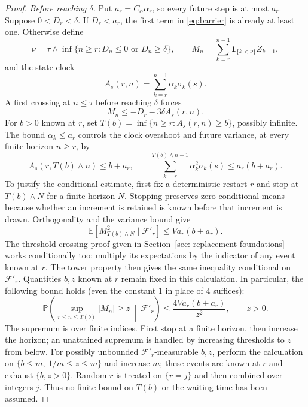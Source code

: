 \begin{proof}
\emph{Before reaching $\delta$.} Put $a_r=C_\alpha\alpha_r$, so every future step is at most $a_r$. Suppose $0<D_r<\delta$. If $D_r<a_r$, the first term in \eqref{eq:barrier} is already
at least one. Otherwise define
\[
\nu=\tau\wedge\inf\{n\ge r:D_n\le0\text{ or }D_n\ge\delta\},\qquad
M_n=\sum_{k=r}^{n-1}\mathbf1_{\{k<\nu\}}Z_{k+1},
\]
and the state clock
\begin{equation}\label{eq:clock}
A_s(r,n)=\sum_{k=r}^{n-1}\alpha_k\sigma_k(s).
\end{equation}
A first crossing at $n\le\tau$ before reaching $\delta$ forces
\begin{equation}\label{eq:crossing}
M_n\le-D_r-3\delta A_s(r,n).
\end{equation}
For $b>0$ known at $r$, set $T(b)=\inf\{n\ge r:A_s(r,n)\ge b\}$, possibly infinite. The bound $\alpha_k\le a_r$ controls the clock overshoot and future variance, at every finite horizon $n\ge r$, by
\[
A_s(r,T(b)\wedge n)\le b+a_r,\qquad
\sum_{k=r}^{T(b)\wedge n-1}\alpha_k^2\sigma_k(s)\le a_r(b+a_r).
\]
To justify the conditional estimate, first fix a deterministic restart $r$ and stop at $T(b)\wedge N$ for a finite horizon $N$. Stopping preserves zero conditional means because whether an increment is retained is known before that increment is drawn. Orthogonality and the variance bound give
\[
\mathbb E[M_{T(b)\wedge N}^2\mid\mathcal F'_r]
\le V a_r(b+a_r).
\]
The threshold-crossing proof given in Section~\ref{sec: replacement foundations} works conditionally too: multiply its expectations by the indicator of any event known at $r$. The tower property then gives the same inequality conditional on $\mathcal F'_r$. Quantities $b,z$ known at $r$ remain fixed in this calculation. In particular, the following bound holds (even the constant $1$ in place of $4$ suffices):
\begin{equation}\label{eq:doob}
\mathbb P\!\left(\sup_{r\le n\le T(b)}|M_n|\ge z\ \middle|\ \mathcal F'_r\right)
\le\frac{4Va_r(b+a_r)}{z^2},\qquad z>0.
\end{equation}
The supremum is over finite indices. First stop at a finite horizon, then increase the horizon;
an unattained supremum is handled by increasing thresholds to $z$ from below. For possibly unbounded $\mathcal F'_r$-measurable $b,z$, perform the calculation on $\{b\le m,\ 1/m\le z\le m\}$ and increase $m$; these events are known at $r$ and exhaust $\{b,z>0\}$. Random $r$ is treated on $\{r=j\}$
and then combined over integers $j$. Thus no finite bound on $T(b)$ or the waiting time has
been assumed.


\end{proof}
